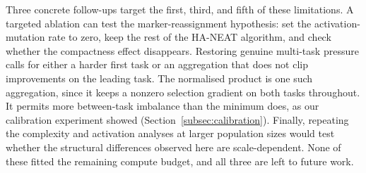 \documentclass[12pt]{article}
\newcommand{\revGram}[2]{#2}
\begin{document}
Three concrete follow-ups target the first, third, and fifth of these limitations.
A targeted ablation can test the marker-reassignment hypothesis: set the activation-mutation rate to zero, keep the rest of the HA-NEAT algorithm, and check whether the compactness effect disappears.
Restoring genuine multi-task pressure calls for either a harder first task or an aggregation that does not clip improvements on the leading task. The normalised product is one such aggregation, since it keeps a nonzero selection gradient on both tasks throughout. \revGram{G-10}{It permits more between-task imbalance than the minimum does}, as our calibration experiment showed (Section~\ref{subsec:calibration}).
Finally, repeating the complexity and activation analyses at larger population sizes would test whether the structural differences observed here are scale-dependent.
None of these fitted the remaining compute budget, and all three are left to future work.


\clearpage \printbibliography
\end{document}
